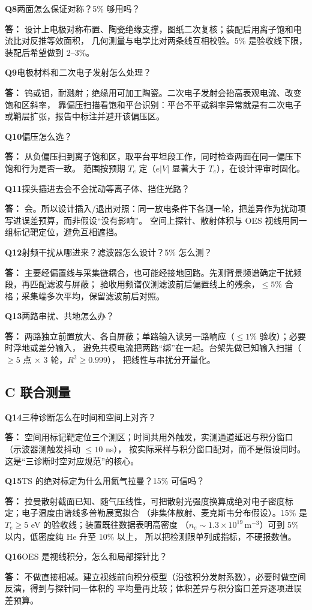 \documentclass[11pt,a4paper]{ctexart}
\newcommand{\qt}[1]{\par\medskip\noindent\textbf{\color{accent}Q#1}\hspace{0.3em}}
\newcommand{\ans}{\par\noindent\hspace{1.1em}\textbf{答：}}
\begin{document}
\qt{8}两面怎么保证对称？5\% 够用吗？\ans
设计上电极对称布置、陶瓷绝缘支撑，图纸二次复核；装配后用离子饱和电流比对反推等效面积，
几何测量与电学比对两条线互相校验。5\% 是验收线下限，装配后希望做到 2--3\%。

\qt{9}电极材料和二次电子发射怎么处理？\ans
钨或钼，耐溅射；绝缘用可加工陶瓷。二次电子发射会抬高表观电流、改变饱和区斜率，
靠偏压扫描看饱和平台识别：平台不平或斜率异常就是有二次电子或鞘层扩张，报告中标注并避开该偏压区。

\qt{10}偏压怎么选？\ans
从负偏压扫到离子饱和区，取平台平坦段工作，同时检查两面在同一偏压下饱和行为是否一致。
范围按预期 $T_e$ 定（$e|V|$ 显著大于 $T_e$），在设计评审时固化。

\qt{11}探头插进去会不会扰动等离子体、挡住光路？\ans
会。所以设计插入/退出对照：同一放电条件下各测一轮，把差异作为扰动项写进误差预算，而非假设“没有影响”。
空间上探针、散射体积与 OES 视线用同一组标记靶定位，避免互相遮挡。

\qt{12}射频干扰从哪进来？滤波器怎么设计？5\% 怎么测？\ans
主要经偏置线与采集链耦合，也可能经接地回路。先测背景频谱确定干扰频段，再匹配滤波与屏蔽；
验收用频谱仪测滤波前后偏置线上的残余，$\le 5\%$ 合格；采集端多次平均，保留滤波前后对照。

\qt{13}两路串扰、共地怎么办？\ans
两路独立前置放大、各自屏蔽；单路输入读另一路响应（$\le1\%$ 验收）；必要时浮地或差分输入，
避免共模电流把两路“绑”在一起。台架先做已知输入扫描（$\ge5$ 点 $\times$ 3 轮，$R^2\ge0.999$），
把线性与串扰分开量化。

\subsection*{C 联合测量}

\qt{14}三种诊断怎么在时间和空间上对齐？\ans
空间用标记靶定位三个测区；时间共用外触发，实测通道延迟与积分窗口（示波器测触发抖动 $\le10$ ns），
按实际采样与积分窗口配对，而不是假设同时。这是“三诊断时空对应规范”的核心。

\qt{15}TS 的绝对标定为什么用氮气拉曼？15\% 可信吗？\ans
拉曼散射截面已知、随气压线性，可把散射光强度换算成绝对电子密度标定；电子温度由谱线多普勒展宽拟合
（非集体散射、麦克斯韦分布假设）。15\% 是 $T_e\ge5$ eV 的验收线；装置既往数据表明高密度
（$n_e\sim1.3\times10^{19}\,\mathrm{m^{-3}}$）可到 5\% 以内，低密度纯 He 升至 10\% 以上，
所以把检测限单列成指标，不硬报数值。

\qt{16}OES 是视线积分，怎么和局部探针比？\ans
不做直接相减。建立视线前向积分模型（沿弦积分发射系数），必要时做空间反演，得到与探针同一体积的
平均量再比较；体积差异与积分窗口差异逐项进误差预算。
\end{document}
